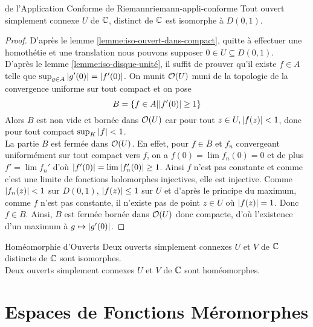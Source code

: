 \documentclass{cours}
\begin{document}
\begin{théorème}
	{de l'Application Conforme de Riemann}{riemann-appli-conforme}
	Tout ouvert simplement connexe $U$ de $\mathbb{C}$, distinct de $\mathbb{C}$ est isomorphe à $D(0, 1)$. 
\end{théorème}
\begin{proof}
	D'après le lemme \ref{lemme:iso-ouvert-dans-compact}, quitte à effectuer une homothétie et une translation nous pouvons supposer $0 \in U \subseteq D(0, 1)$.\\
	D'après le lemme \ref{lemme:iso-disque-unité}, il suffit de prouver qu'il existe $f \in A$ telle que $\sup_{g \in A}\left|g'(0)\right| = \left|f'(0)\right|$. 
	On munit $\mathcal{O}(U)$ muni de la topologie de la convergence uniforme sur tout compact et on pose
	\begin{equation*}
		B = \left\{ f \in A \middle| \left|f'(0)\right| \geq 1\right\}
	\end{equation*}
	Alors $B$ est non vide et bornée dans $\mathcal{O}(U)$ car pour tout $z \in U, \left|f(z)\right| < 1$, donc pour tout compact $\sup_{K}\left|f\right| < 1$. \\
	La partie $B$ est fermée dans $\mathcal{O}(U)$. En effet, pour $f \in \overline{B}$ et $f_{n}$ convergeant uniformément sur tout compact vers $f$, on a $f(0) = \lim f_{n}(0) = 0$ et de plus $f' = \lim f_{n}'$ d'où $\left|f'(0)\right| = \lim \left|f_{n}'(0)\right| \geq 1$. 
	Ainsi $f$ n'est pas constante et comme c'est une limite de fonctions holomorphes injectives, elle est injective. 
	Comme $\left|f_{n}(z)\right| < 1$ sur $D(0, 1)$, $\left|f(z)\right| \leq 1$ sur $U$ et d'après le principe du maximum, comme $f$ n'est pas constante, il n'existe pas de point $z \in U$ où $\left|f(z)\right| = 1$. Donc $f \in B$. 
	Ainsi, $B$ est fermée bornée dans $\mathcal{O}(U)$ donc compacte, d'où l'existence d'un maximum à $g \mapsto \left|g'(0)\right|$. 
\end{proof}

\begin{corollaire}
	{Homéomorphie d'Ouverts}{}
	Deux ouverts simplement connexes $U$ et $V$ de $\mathbb{C}$ distincts de $\mathbb{C}$ sont isomorphes.\\
	Deux ouverts simplement connexes $U$ et $V$ de $\mathbb{C}$ sont homéomorphes. 
\end{corollaire}

\section{Espaces de Fonctions Méromorphes}
\end{document}
